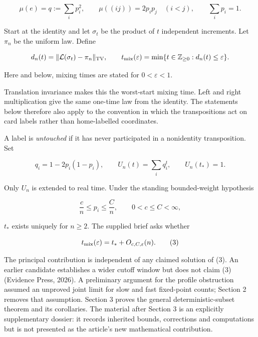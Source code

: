 \documentclass[
  british,
  11pt,
]{article}
\begin{document}
\[
\mu(e)=q:=\sum_i p_i^2,
\qquad \mu((ij))=2p_i p_j\quad(i<j),
\qquad \sum_i p_i=1.
\]

Start at the identity and let \(\sigma_t\) be the product of \(t\)
independent increments. Let \(\pi_n\) be the uniform law. Define

\[
d_n(t)=\|\mathcal L(\sigma_t)-\pi_n\|_{\rm TV},
\qquad
t_{\rm mix}(\varepsilon)=\min\{t\in\mathbb Z_{\ge0}:d_n(t)\le\varepsilon\}.
\]

Here and below, mixing times are stated for \(0<\varepsilon<1\).

Translation invariance makes this the worst-start mixing time. Left and
right multiplication give the same one-time law from the identity. The
statements below therefore also apply to the convention in which the
transpositions act on card labels rather than home-labelled coordinates.

A label is \emph{untouched} if it has never participated in a
nonidentity transposition. Set

\[
q_i=1-2p_i(1-p_i),\qquad
U_n(t)=\sum_i q_i^t,\qquad U_n(t_*)=1. \tag{1}
\]

Only \(U_n\) is extended to real time. Under the standing bounded-weight
hypothesis

\[
\frac cn\le p_i\le\frac Cn,\qquad 0<c\le C<\infty, \tag{2}
\]

\(t_*\) exists uniquely for \(n\ge2\). The supplied brief asks whether

\[
t_{\rm mix}(\varepsilon)=t_*+O_{c,C,\varepsilon}(n). \tag{3}
\]

The principal contribution is independent of any claimed solution of
(3). An earlier candidate establishes a wider cutoff window but does not
claim (3) (Evidence Press, 2026). A preliminary argument for the profile
obstruction assumed an unproved joint limit for slow and fast
fixed-point counts; Section 2 removes that assumption. Section 3 proves
the general deterministic-subset theorem and its corollaries. The
material after Section 3 is an explicitly supplementary dossier: it
records inherited bounds, corrections and computations but is not
presented as the article's new mathematical contribution.
\end{document}
